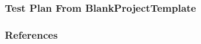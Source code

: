 \documentclass[t,12pt,numbers,fleqn]{beamer}
\begin{document}

\begin{frame}
\frametitle{Test Plan From BlankProjectTemplate}
\end{frame}


\begin{frame}[allowframebreaks]
\frametitle{References}



\end{frame}

\end{document}

